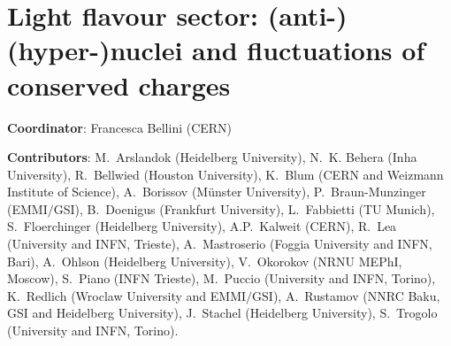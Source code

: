\documentclass[../report.tex]{subfiles}
\providecommand{\main}{..}
\begin{document}
\clearpage
\section{Light flavour sector: (anti-)(hyper-)nuclei and fluctuations of conserved charges}
\label{sec:lf}

{ \small
\noindent \textbf{Coordinator}: Francesca Bellini (CERN)

\noindent \textbf{Contributors}: 
M.~Arslandok (Heidelberg University), 
N.~K. Behera (Inha University), 
R.~Bellwied (Houston University), 
K.~Blum (CERN and Weizmann Institute of Science), 
A.~Borissov (M\"{u}nster University), 
P.~Braun-Munzinger (EMMI$/$GSI), 
B.~Doenigus (Frankfurt University), 
L.~Fabbietti (TU Munich), 
S.~Floerchinger (Heidelberg University), 
A.P.~Kalweit (CERN), 
R.~Lea (University and INFN, Trieste), 
A.~Mastroserio (Foggia University and INFN, Bari),
A.~Ohlson (Heidelberg University), 
V.~Okorokov (NRNU MEPhI, Moscow), 
S.~Piano (INFN Trieste), 
M.~Puccio (University and INFN, Torino), 
K.~Redlich (Wroclaw University and EMMI$/$GSI), 
A.~Rustamov (NNRC Baku, GSI and Heidelberg University), 
J.~Stachel (Heidelberg University), 
S.~Trogolo (University and INFN, Torino).
}





%
\end{document}
